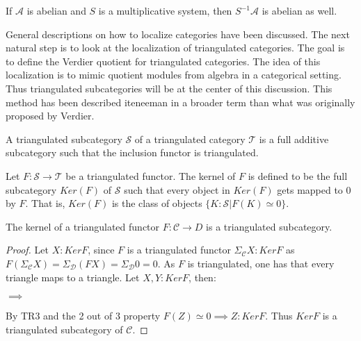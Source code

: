     \begin{corollary}
        If $\mathcal{A}$ is abelian and $S$ is a multiplicative system, then $S^{-1}\mathcal{A}$ is abelian as well.
    \end{corollary}

    General descriptions on how to localize categories have been discussed. The next natural step is to look at the localization of triangulated categories. The goal is to define the Verdier quotient for triangulated categories. The idea of this localization is to mimic quotient modules from algebra in a categorical setting. Thus triangulated subcategories will be at the center of this discussion. This method has been described ite{neeman} in a broader term than what was originally proposed by Verdier.

    \begin{definition}
        A triangulated subcategory $\mathcal{S}$ of a triangulated category $\mathcal{T}$ is a full additive subcategory such that the inclusion functor is triangulated.
    \end{definition}

    \begin{definition}
        Let $F : \mathcal{S} \rightarrow \mathcal{T}$ be a triangulated functor. The kernel of $F$ is defined to be the full subcategory $Ker(F)$ of $\mathcal{S}$ such that every object in $Ker(F)$ gets mapped to $0$ by $F$. That is, $Ker(F)$ is the class of objects $\{K : \mathcal{S} | F(K)\simeq 0\}$.
    \end{definition}

    \begin{lemma}
        The kernel of a triangulated functor $F:\mathcal{C}\rightarrow{D}$ is a triangulated subcategory.
    \end{lemma}

    \begin{proof}
        Let $X:KerF$, since $F$ is a triangulated functor $\Sigma_{\mathcal{C}}X:KerF$ as $F(\Sigma_{\mathcal{C}}X)=\Sigma_{\mathcal{D}}(FX)=\Sigma_{\mathcal{D}}0=0$. As $F$ is triangulated, one has that every triangle maps to a triangle. Let $X,Y:KerF$, then:
        \begin{center}
            $\implies$
        \end{center}
        By TR3 and the 2 out of 3 property $F(Z)\simeq 0 \implies Z:KerF$. Thus $KerF$ is a triangulated subcategory of $\mathcal{C}$.
    \end{proof}

